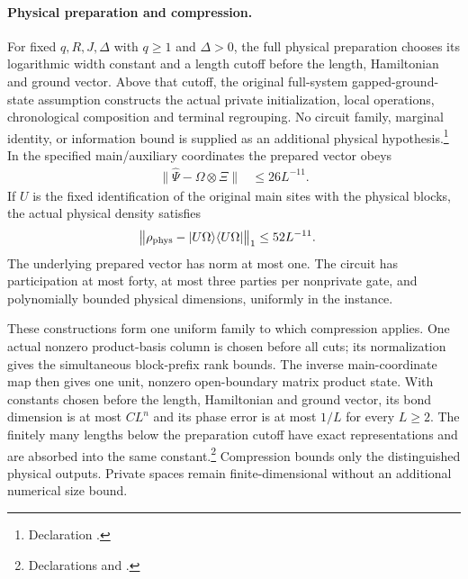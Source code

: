 \documentclass[10pt]{article}
\begin{document}
\paragraph{Physical preparation and compression.}
For fixed $q,R,J,\Delta$ with $q\ge1$ and $\Delta>0$, the full physical
preparation chooses its logarithmic width constant and a length cutoff
before the length, Hamiltonian and ground vector.
Above that cutoff, the original full-system gapped-ground-state assumption
constructs the actual private initialization, local operations, chronological
composition and terminal regrouping. No circuit family, marginal identity,
or information bound is supplied as an additional physical hypothesis.\footnote{
    Declaration .}
In the specified main/auxiliary coordinates the prepared vector obeys
\begin{align}
    \|\widehat\Psi-\Omega\otimes\Xi\| & \le26L^{-11}.
    \label{eq:tnlean_one_dimensional_band_sweep_corrections_vector_error}
\end{align}
If $U$ is the fixed identification of the original main sites with the
physical blocks, the actual physical density satisfies
\begin{align}
    \bigl\|\rho_{\rm phys}-|U\Omega\rangle\langle U\Omega|\bigr\|_1
     & \le52L^{-11}.
    \label{eq:tnlean_one_dimensional_band_sweep_corrections_density_error}
\end{align}
The underlying prepared vector has norm at most one. The circuit has
participation at most forty, at most three parties per nonprivate gate,
and polynomially bounded physical dimensions, uniformly in the instance.

These constructions form one uniform family to which compression applies.
One actual nonzero product-basis column is chosen before all cuts; its
normalization gives the simultaneous block-prefix rank bounds. The inverse
main-coordinate map then gives one unit, nonzero open-boundary matrix
product state. With constants chosen before the length, Hamiltonian and
ground vector, its bond dimension is at most $CL^n$ and its phase error is
at most $1/L$ for every $L\ge2$. The finitely many lengths below the
preparation cutoff have exact representations and are absorbed into the
same constant.\footnote{Declarations
    and .}
Compression bounds only the distinguished physical outputs. Private spaces
remain finite-dimensional without an additional numerical size bound.
\end{document}
